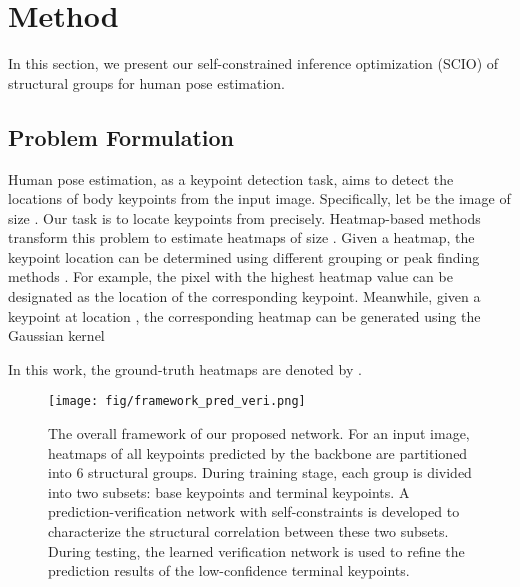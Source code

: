 \documentclass[runningheads]{llncs}
\begin{document}
\section{Method}
In this section, we present our self-constrained inference optimization  (SCIO) of structural groups for human pose estimation.

\subsection{Problem Formulation}
Human pose estimation, as a keypoint detection task, aims to detect the locations of body keypoints from the input image. Specifically, let  be the image of size . Our task is to locate  keypoints  from  precisely. Heatmap-based methods transform this problem to estimate  heatmaps  of size . Given a heatmap, the keypoint location can be determined using different grouping or peak finding methods \cite{DBLP:conf/cvpr/MoonCL19,DBLP:conf/cvpr/SuYXGW19}. 
For example, the pixel with the highest heatmap value can be designated as the location of the corresponding keypoint. 
Meanwhile, given a keypoint at location , the corresponding heatmap can be generated using the Gaussian kernel


In this work, the ground-truth heatmaps are denoted by 
.

\begin{figure*}[t]
\centering
\setlength{\abovecaptionskip}{-0.05cm} 
\setlength{\belowcaptionskip}{-0.8cm} 
\texttt{[image: fig/framework\_pred\_veri.png]}
\centering
\caption{The overall framework of our proposed network. For an input image, heatmaps of all keypoints predicted by the  backbone are partitioned into 6 structural groups. During training stage, each group  is divided into two subsets: base keypoints and terminal keypoints. A prediction-verification network with self-constraints is developed to characterize the structural correlation between these two subsets. During testing, the learned verification network is used to refine the prediction results of the low-confidence terminal keypoints. }
\label{fig:framework}
\end{figure*}
\end{document}
